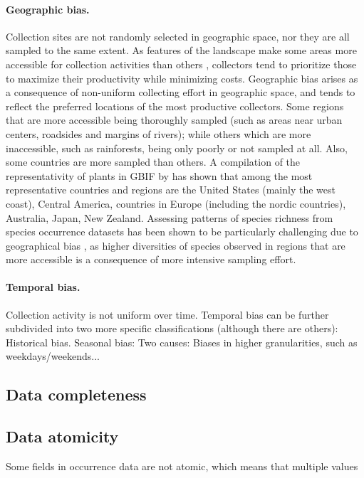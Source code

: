 \paragraph*{Geographic bias.}
Collection sites are not randomly selected in geographic space, nor they are all sampled to the same extent.
As features of the landscape make some areas more accessible for collection activities than others \cite{Hijmans2000}, collectors tend to prioritize those to maximize their productivity while minimizing costs.
Geographic bias arises as a consequence of non-uniform collecting effort in geographic space, and tends to reflect the preferred locations of the most productive collectors.
Some regions that are more accessible being thoroughly sampled (such as areas near urban centers, roadsides and margins of rivers);
while others which are more inaccessible, such as rainforests, being only poorly or not sampled at all.
%
Also, some countries are more sampled than others.
A compilation of the representativity of plants in GBIF by  has shown that among the most representative countries and regions are the United States (mainly the west coast), Central America, countries in Europe (including the nordic countries), Australia, Japan, New Zealand.
%
Assessing patterns of species richness from species occurrence datasets has been shown to be particularly challenging due to geographical bias \cite{Hortal2007,Reddy2003}, as higher diversities of species observed in regions that are more accessible is a consequence of more intensive sampling effort.


\paragraph*{Temporal bias.}
Collection activity is not uniform over time.
Temporal bias can be further subdivided into two more specific classifications (although there are others):
Historical bias. 
Seasonal bias: Two causes: 
Biases in higher granularities, such as weekdays/weekends...


\subsection{Data completeness}

\subsection{Data atomicity}
Some fields in occurrence data are not atomic, which means that multiple values


